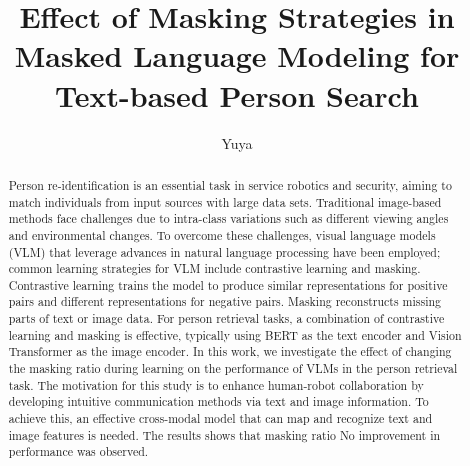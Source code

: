 \documentclass[mscthesis,english,oneside,biblatex,imlex]{template/uefcsthesis}
\title{Effect of Masking Strategies in Masked Language Modeling for Text-based Person Search} %
\author{Yuya}{Takagi} %
\date{\thismonth} %
\begin{document}
\maketitle

\begin{abstract}
Person re-identification is an essential task in service robotics and security, aiming to match individuals from input sources with large data sets. Traditional image-based methods face challenges due to intra-class variations such as different viewing angles and environmental changes. To overcome these challenges, visual language models (VLM) that leverage advances in natural language processing have been employed; common learning strategies for VLM include contrastive learning and masking. Contrastive learning trains the model to produce similar representations for positive pairs and different representations for negative pairs. Masking reconstructs missing parts of text or image data.
For person retrieval tasks, a combination of contrastive learning and masking is effective, typically using BERT as the text encoder and Vision Transformer as the image encoder. In this work, we investigate the effect of changing the masking ratio during learning on the performance of VLMs in the person retrieval task. The motivation for this study is to enhance human-robot collaboration by developing intuitive communication methods via text and image information. To achieve this, an effective cross-modal model that can map and recognize text and image features is needed. The results shows that masking ratio No improvement in performance was observed.
\end{abstract}

\frontmatter
\tableofcontents
\mainmatter
\printglossary[type=\acronymtype]

% 


% 



\appendix
% 


\printbibliography[heading=bibintoc]

\backmatter %
\end{document}
